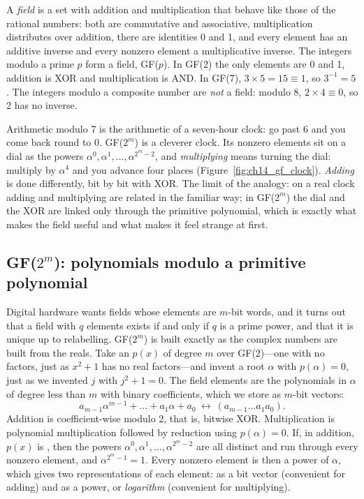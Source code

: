 A \emph{field} is a set with addition and multiplication that behave like those of the rational
numbers: both are commutative and associative, multiplication distributes over addition, there
are identities 0 and 1, and every element has an additive inverse and every nonzero element a
multiplicative inverse. The integers modulo a prime $p$ form a field, GF($p$). In GF(2) the only
elements are 0 and 1, addition is XOR and multiplication is AND. In GF(7), $3\times5=15\equiv1$, so
$3^{-1}=5$. The integers modulo a composite number are \emph{not} a field: modulo 8,
$2\times4\equiv0$, so 2 has no inverse.

\begin{analogy}
Arithmetic modulo 7 is the arithmetic of a seven-hour clock: go past 6 and you come back round to 0.
GF($2^m$) is a cleverer clock. Its nonzero elements sit on a dial as the powers
$\alpha^0,\alpha^1,\dots,\alpha^{2^m-2}$, and \emph{multiplying} means turning the dial: multiply
by $\alpha^4$ and you advance four places (Figure~\ref{fig:ch14_gf_clock}). \emph{Adding} is done
differently, bit by bit with XOR. The limit of the analogy: on a real clock adding and multiplying
are related in the familiar way; in GF($2^m$) the dial and the XOR are linked only through the
primitive polynomial, which is exactly what makes the field useful and what makes it feel strange
at first.
\end{analogy}

\subsection{GF($2^m$): polynomials modulo a primitive polynomial}

Digital hardware wants fields whose elements are $m$-bit words, and it turns out that a field with
$q$ elements exists if and only if $q$ is a prime power, and that it is unique up to relabelling.
GF($2^m$) is built exactly as the complex numbers are built from the reals. Take an
 $p(x)$ of degree $m$ over GF(2)---one with no factors, just as
$x^2+1$ has no real factors---and invent a root $\alpha$ with $p(\alpha)=0$, just as we invented $j$
with $j^2+1=0$. The field elements are the polynomials in $\alpha$ of degree less than $m$ with binary
coefficients, which we store as $m$-bit vectors:
\[
a_{m-1}\alpha^{m-1}+\dots+a_1\alpha+a_0\ \longleftrightarrow\ (a_{m-1}\dots a_1a_0).
\]
Addition is coefficient-wise modulo 2, that is, bitwise XOR. Multiplication is polynomial
multiplication followed by reduction using $p(\alpha)=0$. If, in addition, $p(x)$ is
, then the powers $\alpha^0,\alpha^1,\dots,\alpha^{2^m-2}$ are all distinct and run
through every nonzero element, and $\alpha^{2^m-1}=1$. Every nonzero element is then a power of
$\alpha$, which gives two representations of each element: as a bit vector (convenient for
adding) and as a power, or \emph{logarithm} (convenient for multiplying).

